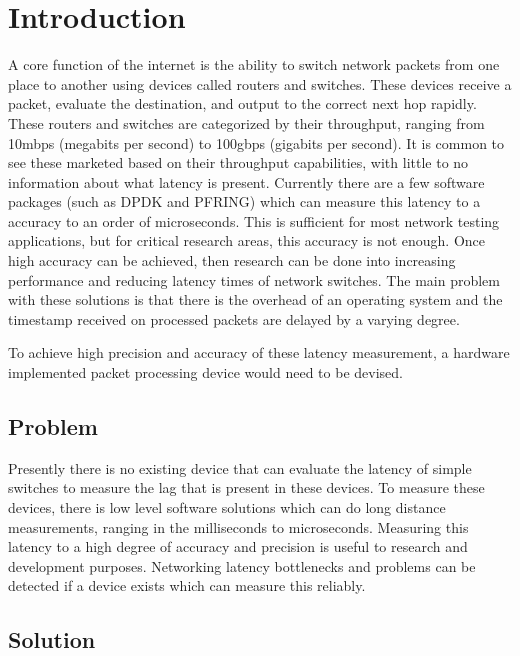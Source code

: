 \chapter{Introduction}\label{C:intro}

\par A core function of the internet is the ability to switch network packets from one place to another using devices called routers and switches.
These devices receive a packet, evaluate the destination, and output to the correct next hop rapidly.
These routers and switches are categorized by their throughput, ranging from 10mbps (megabits per second) to 100gbps (gigabits per second).
It is common to see these marketed based on their throughput capabilities, with little to no information about what latency is present.
Currently there are a few software packages (such as DPDK and PF\textunderscore RING) which can measure this latency to a accuracy to an order of microseconds.
This is sufficient for most network testing applications, but for critical research areas, this accuracy is not enough.
Once high accuracy can be achieved, then research can be done into increasing performance and reducing latency times of network switches.
The main problem with these solutions is that there is the overhead of an operating system and the timestamp received on processed packets are delayed by a varying degree.

\par To achieve high precision and accuracy of these latency measurement, a hardware implemented packet processing device would need to be devised.

\section{Problem}

\par Presently there is no existing device that can evaluate the latency of simple switches to measure the lag that is present in these devices.
To measure these devices, there is low level software solutions which can do long distance measurements, ranging in the milliseconds to microseconds.
Measuring this latency to a high degree of accuracy and precision is useful to research and development purposes.
Networking latency bottlenecks and problems can be detected if a device exists which can measure this reliably.

\section{Solution}

